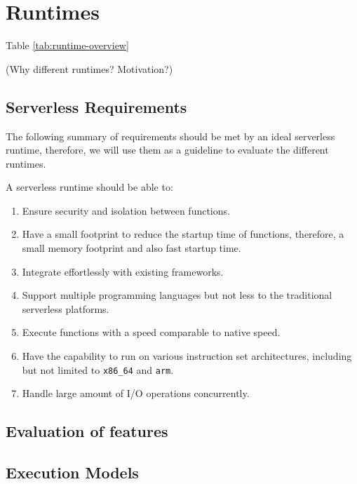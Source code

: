 \chapter{Runtimes}
\label{chap:runtimes}

Table \ref{tab:runtime-overview}

(Why different runtimes? Motivation?)



\section{Serverless Requirements}
\label{sec:serverless-requirements}

The following summary of requirements should be met by an ideal serverless runtime, therefore, we will use them as a guideline to evaluate the different runtimes.

A serverless runtime should be able to:

\begin{enumerate}
	\item Ensure security and isolation between functions.
	\item Have a small footprint to reduce the startup time of functions, therefore, a small memory footprint and also fast startup time. 
	\item Integrate effortlessly with existing frameworks. 
	\item Support multiple programming languages but not less to the traditional serverless platforms. 
	\item Execute functions with a speed comparable to native speed.
	\item Have the capability to run on various instruction set architectures, including but not limited to \texttt{x86\_64} and \texttt{arm}.
	\item Handle large amount of I/O operations concurrently.
\end{enumerate}

\section{Evaluation of features}
\label{sec:evaluation-of-features}

\section{Execution Models}
\label{sec:execution-models}

